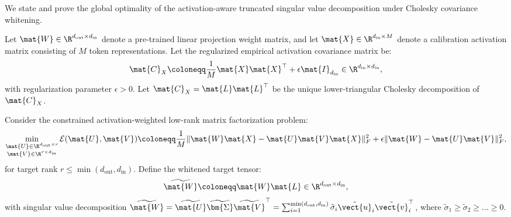We state and prove the global optimality of the activation-aware truncated singular value decomposition under Cholesky covariance whitening.

\begin{theorem}
\label{thm:app_svdllm_v2_optimality}
Let $\mat{W} \in \R^{d_{\text{out}} \times d_{\text{in}}}$ denote a pre-trained linear projection weight matrix, and let $\mat{X} \in \R^{d_{\text{in}} \times M}$ denote a calibration activation matrix consisting of $M$ token representations. Let the regularized empirical activation covariance matrix be:
\begin{equation}
\mat{C}_X \coloneqq \frac{1}{M} \mat{X} \mat{X}^\top + \epsilon \mat{I}_{d_{\text{in}}} \in \R^{d_{\text{in}} \times d_{\text{in}}},
\label{eq:cov_regularized_def}
\end{equation}
with regularization parameter $\epsilon > 0$. Let $\mat{C}_X = \mat{L} \mat{L}^\top$ be the unique lower-triangular Cholesky decomposition of $\mat{C}_X$.

Consider the constrained activation-weighted low-rank matrix factorization problem:
\begin{equation}
\min_{\substack{\mat{U} \in \R^{d_{\text{out}} \times r} \\ \mat{V} \in \R^{r \times d_{\text{in}}}}} \mathcal{E}(\mat{U}, \mat{V}) \coloneqq \frac{1}{M} \|\mat{W} \mat{X} - \mat{U} \mat{V} \mat{X}\|_F^2 + \epsilon \|\mat{W} - \mat{U} \mat{V}\|_F^2,
\label{eq:thm1_primal_problem}
\end{equation}
for target rank $r \le \min(d_{\text{out}}, d_{\text{in}})$. Define the whitened target tensor:
\begin{equation}
\widetilde{\mat{W}} \coloneqq \mat{W} \mat{L} \in \R^{d_{\text{out}} \times d_{\text{in}}},
\label{eq:whitened_weight_def}
\end{equation}
with singular value decomposition $\widetilde{\mat{W}} = \widetilde{\mat{U}} \widetilde{\bm{\Sigma}} \widetilde{\mat{V}}^\top = \sum_{i=1}^{\min(d_{\text{out}}, d_{\text{in}})} \tilde{\sigma}_i \tilde{\vect{u}}_i \tilde{\vect{v}}_i^\top$, where $\tilde{\sigma}_1 \ge \tilde{\sigma}_2 \ge \dots \ge 0$.


\end{theorem}
